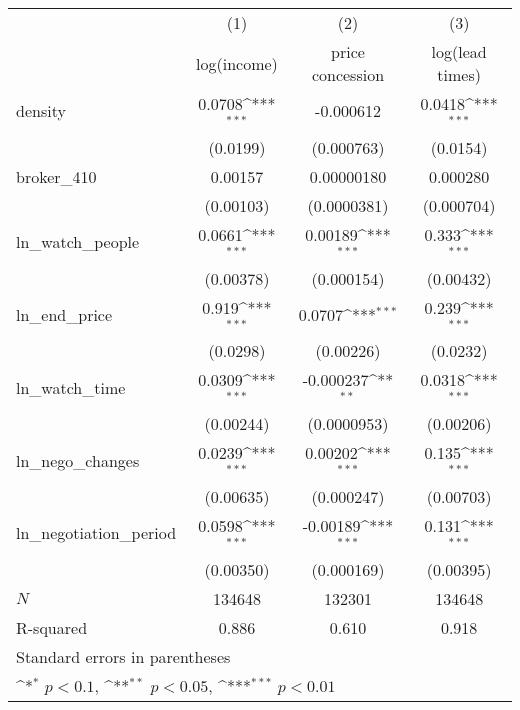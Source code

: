 {
\def\sym#1{\ifmmode^{#1}\else\(^{#1}\)\fi}
\begin{tabular}{l*{3}{c}}
\toprule
            &\multicolumn{1}{c}{(1)}&\multicolumn{1}{c}{(2)}&\multicolumn{1}{c}{(3)}\\
            &\multicolumn{1}{c}{log(income)}&\multicolumn{1}{c}{price concession}&\multicolumn{1}{c}{log(lead times)}\\
\midrule
density     &      0.0708\sym{***}&   -0.000612         &      0.0418\sym{***}\\
            &    (0.0199)         &  (0.000763)         &    (0.0154)         \\
\addlinespace
broker\_410  &     0.00157         &  0.00000180         &    0.000280         \\
            &   (0.00103)         & (0.0000381)         &  (0.000704)         \\
\addlinespace
ln\_watch\_people&      0.0661\sym{***}&     0.00189\sym{***}&       0.333\sym{***}\\
            &   (0.00378)         &  (0.000154)         &   (0.00432)         \\
\addlinespace
ln\_end\_price&       0.919\sym{***}&      0.0707\sym{***}&       0.239\sym{***}\\
            &    (0.0298)         &   (0.00226)         &    (0.0232)         \\
\addlinespace
ln\_watch\_time&      0.0309\sym{***}&   -0.000237\sym{**} &      0.0318\sym{***}\\
            &   (0.00244)         & (0.0000953)         &   (0.00206)         \\
\addlinespace
ln\_nego\_changes&      0.0239\sym{***}&     0.00202\sym{***}&       0.135\sym{***}\\
            &   (0.00635)         &  (0.000247)         &   (0.00703)         \\
\addlinespace
ln\_negotiation\_period&      0.0598\sym{***}&    -0.00189\sym{***}&       0.131\sym{***}\\
            &   (0.00350)         &  (0.000169)         &   (0.00395)         \\
\midrule
\(N\)       &      134648         &      132301         &      134648         \\
R-squared   &       0.886         &       0.610         &       0.918         \\
\bottomrule
\multicolumn{4}{l}{\footnotesize Standard errors in parentheses}\\
\multicolumn{4}{l}{\footnotesize \sym{*} \(p<0.1\), \sym{**} \(p<0.05\), \sym{***} \(p<0.01\)}\\
\end{tabular}
}
